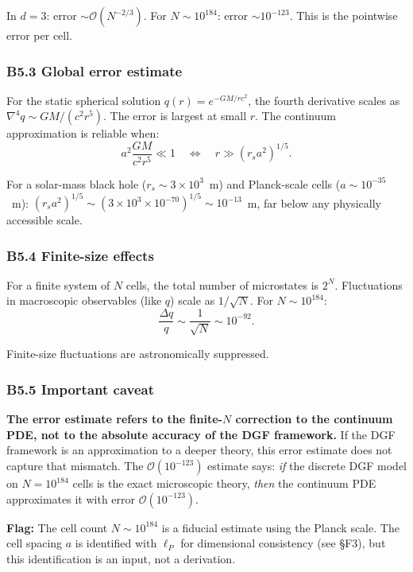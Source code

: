 \documentclass[reprint]{revtex4-2}
\begin{document}
In $d=3$: error $\sim \mathcal{O}(N^{-2/3})$. For $N\sim 10^{184}$: error $\sim 10^{-123}$. This is the pointwise error per cell.

\subsubsection{B5.3 Global error estimate}

For the static spherical solution $q(r) = e^{-GM/rc^2}$, the fourth derivative scales as $\nabla^4 q \sim GM/(c^2 r^5)$. The error is largest at small $r$. The continuum approximation is reliable when:
\begin{equation}
a^2 \frac{GM}{c^2 r^5} \ll 1 \quad\Longleftrightarrow\quad r \gg (r_s a^2)^{1/5}.
\end{equation}

For a solar-mass black hole ($r_s \sim 3\times 10^3$~m) and Planck-scale cells ($a \sim 10^{-35}$~m): $(r_s a^2)^{1/5} \sim (3\times 10^3 \times 10^{-70})^{1/5} \sim 10^{-13}$~m, far below any physically accessible scale.

\subsubsection{B5.4 Finite-size effects}

For a finite system of $N$ cells, the total number of microstates is $2^N$. Fluctuations in macroscopic observables (like $q$) scale as $1/\sqrt{N}$. For $N\sim 10^{184}$:
\begin{equation}
\frac{\Delta q}{q} \sim \frac{1}{\sqrt{N}} \sim 10^{-92}.
\end{equation}

Finite-size fluctuations are astronomically suppressed.

\subsubsection{B5.5 Important caveat}

\textbf{The error estimate refers to the finite-$N$ correction to the continuum PDE, not to the absolute accuracy of the DGF framework.} If the DGF framework is an approximation to a deeper theory, this error estimate does not capture that mismatch. The $\mathcal{O}(10^{-123})$ estimate says: \emph{if} the discrete DGF model on $N=10^{184}$ cells is the exact microscopic theory, \emph{then} the continuum PDE approximates it with error $\mathcal{O}(10^{-123})$.

\textbf{Flag:} The cell count $N\sim 10^{184}$ is a fiducial estimate using the Planck scale. The cell spacing $a$ is identified with $\ell_P$ for dimensional consistency (see \S F3), but this identification is an input, not a derivation.
\end{document}
